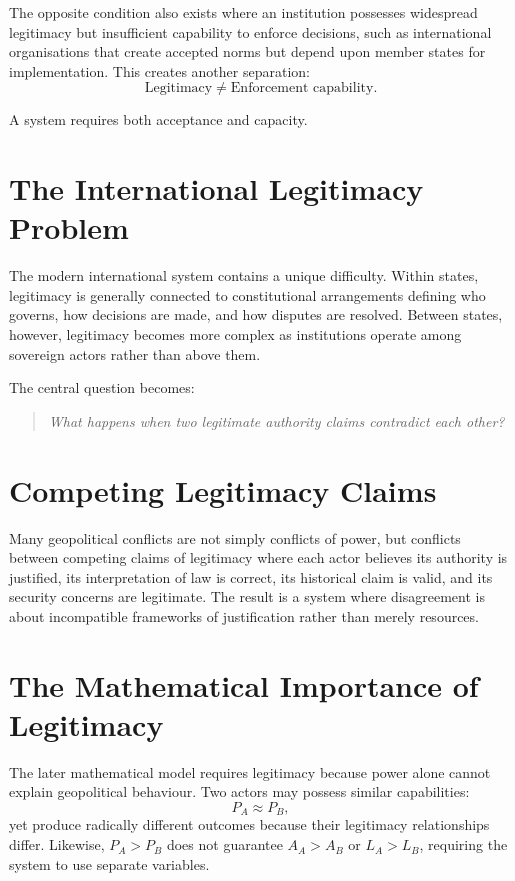 \documentclass[11pt,openany]{book}
\theoremstyle{plain}
\theoremstyle{definition}
\begin{document}
The opposite condition also exists where an institution possesses widespread legitimacy but insufficient capability to enforce decisions, such as international organisations that create accepted norms but depend upon member states for implementation. This creates another separation:
\[
\text{Legitimacy} \neq \text{Enforcement capability}.
\]

A system requires both acceptance and capacity.

\section*{The International Legitimacy Problem}

The modern international system contains a unique difficulty. Within states, legitimacy is generally connected to constitutional arrangements defining who governs, how decisions are made, and how disputes are resolved. Between states, however, legitimacy becomes more complex as institutions operate among sovereign actors rather than above them.

The central question becomes:
\begin{quote}
\textit{What happens when two legitimate authority claims contradict each other?}
\end{quote}

\section*{Competing Legitimacy Claims}

Many geopolitical conflicts are not simply conflicts of power, but conflicts between competing claims of legitimacy where each actor believes its authority is justified, its interpretation of law is correct, its historical claim is valid, and its security concerns are legitimate. The result is a system where disagreement is about incompatible frameworks of justification rather than merely resources.

\section*{The Mathematical Importance of Legitimacy}

The later mathematical model requires legitimacy because power alone cannot explain geopolitical behaviour. Two actors may possess similar capabilities:
\[
P_A \approx P_B,
\]
yet produce radically different outcomes because their legitimacy relationships differ. Likewise, \(P_A > P_B\) does not guarantee \(A_A > A_B\) or \(L_A > L_B\), requiring the system to use separate variables.
\end{document}
